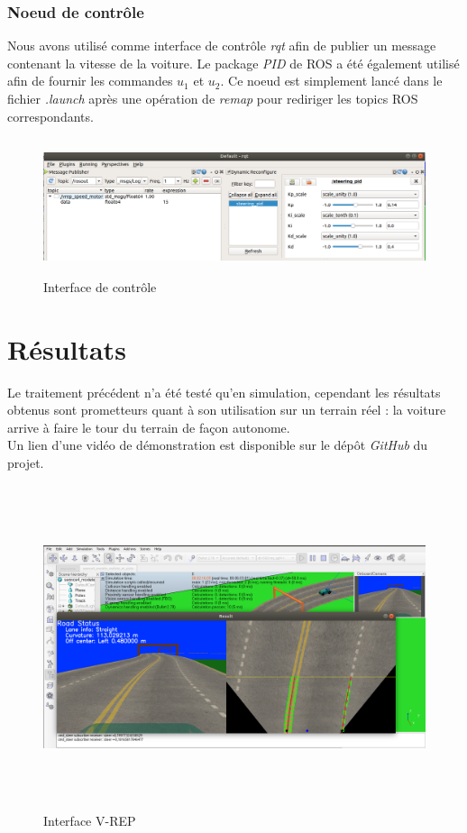 \documentclass[12pt, openany]{report}
\begin{document}
\subsubsection{Noeud de contrôle}
Nous avons utilisé comme interface de contrôle \textit{rqt} afin de publier un message contenant la vitesse de la voiture. Le package \textit{PID} de \textsc{ROS} a été également utilisé afin de fournir les commandes $u_1$ et $u_2$. Ce noeud est simplement lancé dans le fichier \textit{.launch} après une opération de \textit{remap} pour rediriger les topics \textsc{ROS} correspondants.

\begin{figure}[H]
     \centering
         \includegraphics[width=\textwidth, height = 4cm]{inter_ctrl.png}
        \caption{Interface de contrôle}
        \label{fig:res}     
\end{figure}

\section{Résultats}
Le traitement précédent n'a été testé qu'en simulation, cependant les résultats obtenus sont prometteurs quant à son utilisation sur un terrain réel : la voiture arrive à faire le tour du terrain de façon autonome.\\

Un lien d'une vidéo de démonstration est disponible sur le dépôt \textit{GitHub} du projet.

\begin{figure}[H]
     \centering
         \includegraphics[width=\textwidth, height = 9.5cm]{test_res.png}
        \caption{Interface V-REP}
        \label{fig:res}     
\end{figure}
\end{document}
